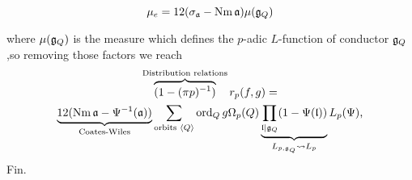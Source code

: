 \begin{frame}
\begin{theorem}
\begin{equation*}
\mu_e = 12 (\sigma_{\mathfrak{a}} - \operatorname{Nm} \mathfrak{a}) \mu (\mathfrak{g} _Q)
\end{equation*}
\end{theorem}
where \(\mu (\mathfrak{g}_Q)\) is the measure which defines the \(p\)-adic \(L\)-function of conductor \(\mathfrak{g}_Q\),\pause so removing those factors we reach%
\begin{multline*}
    \overbrace{(1 - (\pi p )^{-1})}^{\text{Distribution relations}} r_p ( f,g) =\\
\underbrace{12 ( \operatorname{Nm} \mathfrak{a} - \Psi^{-1} (\mathfrak{a}))}_{\text{Coates-Wiles}} \sum_{\text{orbits } \langle Q \rangle} \operatorname{ord}_Q g \Omega_p(Q) \underbrace{\prod_{\mathfrak{l} | \mathfrak{g}_Q} (1- \Psi (\mathfrak{l}))}_{L_{p,\mathfrak{g}_Q} \leadsto L_p} L_p (\Psi)\text{,}
\end{multline*}
\pause
Fin.%
\end{frame}


